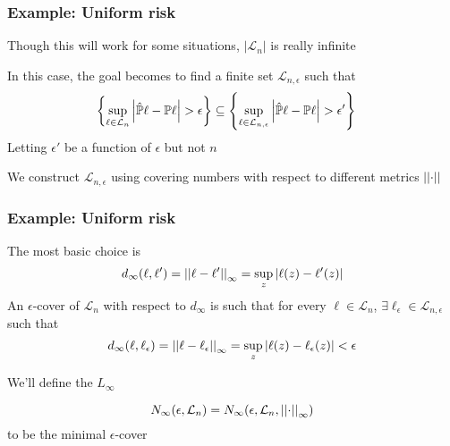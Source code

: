 \documentclass[12pt]{beamer}
\begin{document}
\begin{frame}[fragile]
\frametitle{Example: Uniform risk }
Though this will work for some situations, $|\mathcal{L}_n|$ is really infinite

\vsp
In this case, the goal becomes to find a finite set $\mathcal{L}_{n,\epsilon}$ such that
\begin{align*}
\left\{ \sup_{\ell \in \mathcal{L}_n} \left| \hat\P\ell - \P\ell \right| > \epsilon \right\} & \subseteq
\left\{ \sup_{\ell \in \mathcal{L}_{n,\epsilon}} \left| \hat\P\ell - \P\ell \right| > \epsilon' \right\}
\end{align*}
Letting $\epsilon'$ be a function of $\epsilon$ but not $n$

\vsp
We construct $\mathcal{L}_{n,\epsilon}$ using covering numbers with respect to different metrics $\norm{\cdot}$

\end{frame}

\begin{frame}[fragile]
\frametitle{Example: Uniform risk }
The most  basic choice is 
\[
d_{\infty}(\ell,\ell') = \norm{\ell - \ell'}_{\infty} = \sup_z| \ell(z) - \ell'(z)|
\]
An $\epsilon$-cover of $\mathcal{L}_n$ with respect to $d_{\infty}$ is such that for every $\ell \in \mathcal{L}_n$,
$\exists \ell_{\epsilon} \in \mathcal{L}_{n,\epsilon}$ such that
\[
d_{\infty}(\ell,\ell_\epsilon) = \norm{\ell - \ell_\epsilon}_{\infty} = \sup_z| \ell(z) - \ell_\epsilon(z)| < \epsilon
\]

\vsp
We'll define the $L_{\infty}$  

\[
N_\infty(\epsilon,\mathcal{L}_n) = N_\infty(\epsilon,\mathcal{L}_n,\norm{\cdot}_\infty)
\]
to be the minimal $\epsilon$-cover


\end{frame}
\end{document}
